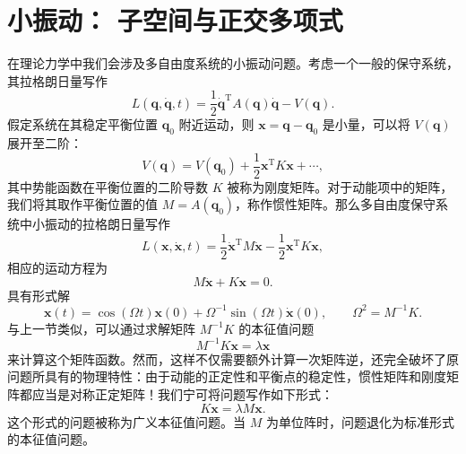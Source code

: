\section{小振动： 子空间与正交多项式}

在理论力学中我们会涉及多自由度系统的小振动问题。考虑一个一般的保守系统，其拉格朗日量写作
\begin{equation}
L(\bm q,\dot{\bm q},t)=\frac12\dot{\bm q}^{\mathrm T}A(\bm q)\dot{\bm q}-V(\bm q).
\tag{3.5.1}
\end{equation}
假定系统在其稳定平衡位置 $\bm q_0$ 附近运动，则 $\bm x=\bm q-\bm q_0$ 是小量，可以将 $V(\bm q)$ 展开至二阶：
\begin{equation}
V(\bm q)=V(\bm q_0)+\frac12\bm x^{\mathrm T}K\bm x+\cdots,
\tag{3.5.2}
\end{equation}
其中势能函数在平衡位置的二阶导数 $K$ 被称为刚度矩阵。对于动能项中的矩阵，我们将其取作平衡位置的值 $M=A(\bm q_0)$，称作惯性矩阵。那么多自由度保守系统中小振动的拉格朗日量写作
\begin{equation}
L(\bm x,\dot{\bm x},t)=\frac12\dot{\bm x}^{\mathrm T}M\dot{\bm x}-\frac12\bm x^{\mathrm T}K\bm x,
\tag{3.5.3}
\end{equation}
相应的运动方程为
\begin{equation}
M\ddot{\bm x}+K\bm x=0.
\tag{3.5.4}
\end{equation}
具有形式解
\begin{equation}
\bm x(t)=\cos(\Omega t)\bm x(0)+\Omega^{-1}\sin(\Omega t)\dot{\bm x}(0),
\qquad \Omega^2=M^{-1}K.
\tag{3.5.5}
\end{equation}
与上一节类似，可以通过求解矩阵 $M^{-1}K$ 的本征值问题
\begin{equation}
M^{-1}K\bm x=\lambda\bm x
\tag{3.5.6}
\end{equation}
来计算这个矩阵函数。然而，这样不仅需要额外计算一次矩阵逆，还完全破坏了原问题所具有的物理特性：由于动能的正定性和平衡点的稳定性，惯性矩阵和刚度矩阵都应当是对称正定矩阵！我们宁可将问题写作如下形式：
\begin{equation}
K\bm x=\lambda M\bm x.
\tag{3.5.7}
\end{equation}
这个形式的问题被称为广义本征值问题。当 $M$ 为单位阵时，问题退化为标准形式的本征值问题。

